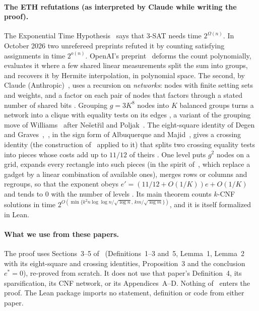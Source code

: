 \documentclass[11pt]{article}
\begin{document}
\paragraph{The ETH refutations (as interpreted by Claude while writing the proof).} The Exponential Time Hypothesis~\cite{IP01} says that 3-SAT needs time
$2^{\Omega(n)}$. In October 2026 two unrefereed preprints refuted it by counting satisfying assignments in
time $2^{o(n)}$. OpenAI's preprint~\cite{Ope26} deforms the count polynomially, evaluates it where a few shared linear
measurements split the sum into groups, and recovers it by Hermite interpolation, in polynomial space. The second, by Claude
(Anthropic)~\cite{Cla26}, uses a recursion on \emph{networks}: nodes with finite setting sets and weights, and a
factor on each pair of nodes that factors through a stated number of shared bits \cite[Defs.~1--2]{Cla26}.
Grouping $g=3K^8$ nodes into $K$ balanced groups turns a network into a clique with equality tests on its edges
\cite[Lemma~1]{Cla26}, a variant of the grouping move of Williams~\cite{Wil05} after Ne\v{s}et\v{r}il and
Poljak~\cite{NP85}. The eight-square identity of Degen and Graves~\cite[\S1]{Bae02},~\cite[\S6.10]{CS03}, in
the sign form of Albuquerque and Majid~\cite[Props.~3.7, 4.4]{AM99}, gives a crossing identity (the construction
of~\cite[Prop.~4.1]{HWY11} applied to it) that splits two crossing equality tests into pieces whose costs add up to
$11/12$ of theirs \cite[Lemma~2]{Cla26}. One level puts $g^2$ nodes on a grid, expands every rectangle into such
pieces (in the spirit of~\cite{GL99,CX15}, which replace a gadget by a linear combination of available ones),
merges rows or columns and regroups, so that the exponent obeys $e'=(11/12+O(1/K))e+O(1/K)$ and tends to $0$ with
the number of levels \cite[Prop.~3]{Cla26}. Its main theorem counts $k$-CNF solutions in time $2^{O(\min\{k^2 n\log\log n/\sqrt{\log n},\,km/\sqrt{\log
m}\})}$, and it is itself formalized in Lean.

\paragraph{What we use from these papers.} The proof uses Sections~3--5 of~\cite{Cla26}
(Definitions~1--3 and~5, Lemma~1, Lemma~2 with its eight-square and crossing identities, Proposition~3 and the
conclusion $e^*=0$), re-proved from scratch. It does not use that paper's Definition~4, its sparsification, its
CNF network, or its Appendices~A--D. Nothing of~\cite{Ope26} enters the proof. The Lean package imports no statement, definition or code from either paper.
\end{document}
